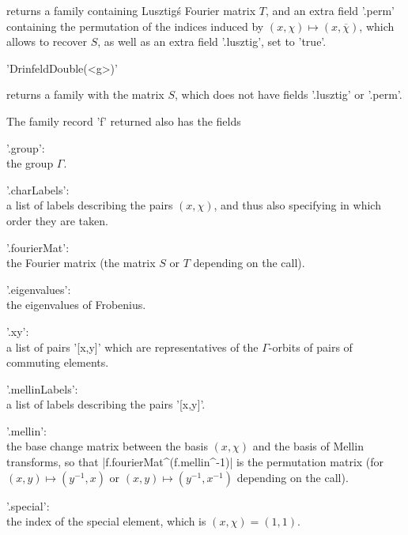 returns  a family  containing Lusztig\'s  Fourier matrix  $T$, and an extra
field  '.perm'  containing  the  permutation  of  the  indices  induced  by
$(x,\chi)\mapsto(x,\overline\chi)$, which allows to recover $S$, as well as
an extra field '.lusztig', set to 'true'.

'DrinfeldDouble(<g>)'

returns a family with the matrix $S$, which does not have fields '.lusztig'
or '.perm'.

The family record 'f' returned also has the fields\:

'.group':\\ the group $\Gamma$.

'.charLabels':\\  a list of labels describing  the pairs $(x,\chi)$, and thus
also specifying in which order they are taken.

'.fourierMat':\\ the Fourier matrix (the matrix $S$ or $T$ depending on the
call).

'.eigenvalues':\\ the eigenvalues of Frobenius.

'.xy':\\ a list of pairs '[x,y]' which are representatives of the
$\Gamma$-orbits of pairs of commuting elements.

'.mellinLabels':\\ a list of labels describing the pairs '[x,y]'.

'.mellin':\\  the base  change matrix  between the  basis $(x,\chi)$  and the
basis  of Mellin  transforms, so  that |f.fourierMat^(f.mellin^-1)|  is the
permutation matrix (for $(x,y)\mapsto(y^{-1},x)$ or
$(x,y)\mapsto(y^{-1},x^{-1})$ depending on the call).

'.special':\\ the index of the special element, which is $(x,\chi)=(1,1)$.

